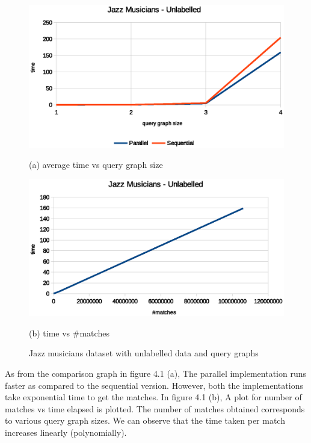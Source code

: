 \begin{figure}[h!]
    \centering
    \begin{minipage}[b]{.45\textwidth}
        \hspace*{-0.5in}
        \includegraphics[scale=0.55]{images/Jazz_unlabelled.eps}
        \caption*{(a) average time vs query graph size}        
    \end{minipage} \hfill  
    \begin{minipage}[b]{.45\textwidth}
        \hspace*{-0.2in}
        \includegraphics[scale=0.55]{images/Jazz_unlabelled_tpm.eps}
        \caption*{(b) time vs \#matches}       
    \end{minipage}   
\caption{Jazz musicians dataset with unlabelled data and query graphs}
\label{fig:distmx}
\end{figure}

As from the comparison graph in figure 4.1 (a), The parallel implementation runs faster as compared to the sequential version. However, both the implementations take exponential time to get the matches. In figure 4.1 (b), A plot for number of matches vs time elapsed is plotted. The number of matches obtained corresponds to various query graph sizes. We can observe that the time taken per match increases linearly (polynomially).

